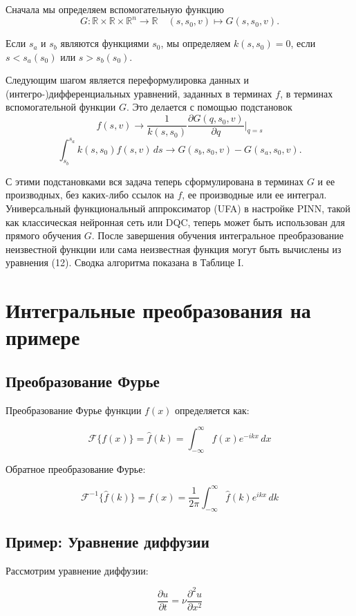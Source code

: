 \documentclass[a4paper,12pt]{article}
\theoremstyle{plain} %
\theoremstyle{definition} %
\theoremstyle{remark} %
\begin{document}
Сначала мы определяем вспомогательную функцию
\[
G : \mathbb{R} \times \mathbb{R} \times \mathbb{R}^n \rightarrow \mathbb{R} \quad (s, s_0, v) \mapsto G(s, s_0, v).
\]

Если \(s_a\) и \(s_b\) являются функциями \(s_0\), мы определяем \(k(s, s_0) = 0\), если \(s < s_a(s_0)\) или \(s > s_b(s_0)\).

Следующим шагом является переформулировка данных и (интегро-)дифференциальных уравнений, заданных в терминах \(f\), в терминах вспомогательной функции \(G\). Это делается с помощью подстановок
\[
f(s, v) \rightarrow \frac{1}{k(s, s_0)} \frac{\partial G(q, s_0, v)}{\partial q} \bigg|_{q=s}
\]
\[
\int_{s_b}^{s_a} k(s, s_0) f(s, v) \, ds \rightarrow G(s_b, s_0, v) - G(s_a, s_0, v).
\]

С этими подстановками вся задача теперь сформулирована в терминах \(G\) и ее производных, без каких-либо ссылок на \(f\), ее производные или ее интеграл. Универсальный функциональный аппроксиматор (UFA) в настройке PINN, такой как классическая нейронная сеть или DQC, теперь может быть использован для прямого обучения \(G\). После завершения обучения интегральное преобразование неизвестной функции или сама неизвестная функция могут быть вычислены из уравнения (12). Сводка алгоритма показана в Таблице I.

\section{Интегральные преобразования на примере}

\subsection{Преобразование Фурье}

Преобразование Фурье функции \( f(x) \) определяется как:

\[
\mathcal{F}\{f(x)\} = \hat{f}(k) = \int_{-\infty}^{\infty} f(x) e^{-ikx} \, dx
\]

Обратное преобразование Фурье:

\[
\mathcal{F}^{-1}\{\hat{f}(k)\} = f(x) = \frac{1}{2\pi} \int_{-\infty}^{\infty} \hat{f}(k) e^{ikx} \, dk
\]

\subsection{Пример: Уравнение диффузии}

Рассмотрим уравнение диффузии:

\[
\frac{\partial u}{\partial t} = \nu \frac{\partial^2 u}{\partial x^2}
\]
\end{document}
